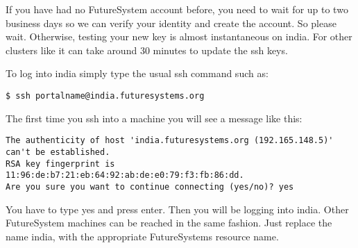 If you have had no FutureSystem account before, you need to wait for up
to two business days so we can verify your identity and create the
account. So please wait. Otherwise, testing your new key is almost
instantaneous on india. For other clusters like it can take around 30
minutes to update the ssh keys.

To log into india simply type the usual ssh command such as:

\begin{verbatim}
$ ssh portalname@india.futuresystems.org
\end{verbatim}

The first time you ssh into a machine you will see a message like this:

\begin{verbatim}
The authenticity of host 'india.futuresystems.org (192.165.148.5)' can't be established.
RSA key fingerprint is 11:96:de:b7:21:eb:64:92:ab:de:e0:79:f3:fb:86:dd.
Are you sure you want to continue connecting (yes/no)? yes 
\end{verbatim}

You have to type yes and press enter. Then you will be logging into
india. Other FutureSystem machines can be reached in the same fashion.
Just replace the name india, with the appropriate FutureSystems resource
name.
